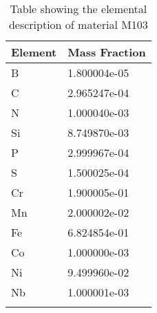 \begin{centering}
\begin{longtable}[ht!]
{ p{} | p{} }
\hline
Element & Mass Fraction\\
\hline
B &  1.800004e-05\\
C &  2.965247e-04\\
N &  1.000040e-03\\
Si &  8.749870e-03\\
P &  2.999967e-04\\
S &  1.500025e-04\\
Cr &  1.900005e-01\\
Mn &  2.000002e-02\\
Fe &  6.824854e-01\\
Co &  1.000000e-03\\
Ni &  9.499960e-02\\
Nb &  1.000001e-03\\

\caption{Table showing the elemental description of material M103}
\label{table:material_M103}
\end{longtable}
\clearpage


\end{centering}
